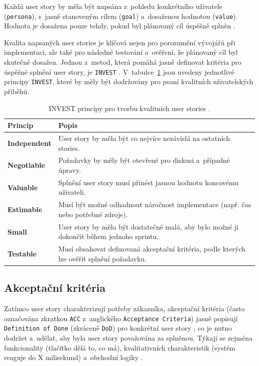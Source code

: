 \documentclass[czech, ing, kiv, he, iso690numb, viewonly]{fasthesis}
\begin{document}
Každá user story by měla být napsána z~pohledu konkrétního uživatele (\texttt{persona}), s~jasně stanoveným cílem (\texttt{goal}) 
a~dosaženou hodnotou (\texttt{value}). Hodnota je dosažena pouze tehdy, pokud byl plánovaný cíl úspěšně splněn \cite{9325670userStories}.

Kvalita napsaných user stories je klíčová nejen pro porozumění vývojářů při implementaci, ale také pro následné testování a~ověření, že plánovaný 
cíl byl skutečně dosažen. Jednou z~metod, která pomáhá jasně definovat kritéria pro úspěšné splnění user story, je \texttt{INVEST} \cite{lucassen2016useinvest}. 
V~tabulce~\ref{tab:invest_principy} jsou uvedeny jednotlivé principy \texttt{INVEST}, které by měly být dodržovány pro psaní kvalitních uživatelských příběhů.

\begin{table}[H]
\centering
\begin{tabular}{|l|p{10cm}|}
\hline
\textbf{Princip} & \textbf{Popis} \\ \hline
\textbf{Independent} & User story by měla být co nejvíce nezávislá na ostatních stories. \\ \hline
\textbf{Negotiable} & Požadavky by měly být otevřené pro diskusi a~případné úpravy. \\ \hline
\textbf{Valuable} & Splnění user story musí přinést jasnou hodnotu koncovému uživateli. \\ \hline
\textbf{Estimable} & Musí být možné odhadnout náročnost implementace (např. čas nebo potřebné zdroje). \\ \hline
\textbf{Small} & User story by měla být dostatečně malá, aby bylo možné ji dokončit během jednoho sprintu. \\ \hline
\textbf{Testable} & Musí obsahovat definovaná akceptační kritéria, podle kterých lze ověřit splnění požadavku. \\ \hline
\end{tabular}
\caption{INVEST principy pro tvorbu kvalitních user stories \cite{6693222invest}.}
\label{tab:invest_principy}
\end{table}

\subsection{Akceptační kritéria}
Zatímco user story charakterizují potřeby zákazníka, akceptační kritéria (často označována zkratkou \texttt{ACC} z~anglického \texttt{Acceptance Criteria}) 
jasně popisují \texttt{Definition of Done} (zkráceně \texttt{DoD}) pro konkrétní user story \cite{li2024simac}, co je nutno dodržet a~udělat, aby byla user
 story považována za splněnou. Týkají se zejména funkcionality (tlačítko dělá to, co má), kvalitativních charakteristik 
 (systém reaguje do X milisekund) a~obchodní logiky \cite{ferreira2022towards}. 
\end{document}
